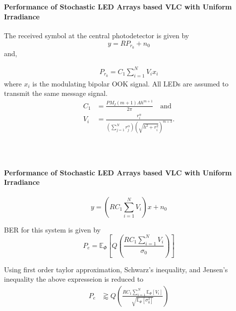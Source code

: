 \documentclass[slidestop,usepdftitle=false]{gvvslides}
\providecommand{\sbrak}[1]{\ensuremath{{}\left[#1\right]}}
\providecommand{\brak}[1]{\ensuremath{\left(#1\right)}}
\begin{document}
\begin{frame}
\frametitle{\,}
\framesubtitle{Performance of Stochastic LED Arrays based VLC with Uniform Irradiance}
\begin{list}{}{}
\vfill
\item<1->The received symbol at the central photodetector is given by 
\begin{equation}
y=RP_{r_0}+n_0 \nonumber
\label{rx_center}
\end{equation}
and,
\item<2>
\vspace{-.4in}
\begin{align}
P_{r_0}
=C_1\sum_{i=1}^NV_i x_i  \nonumber
\label{pr_exact}
\end{align}
where $x_i$ is the modulating bipolar OOK signal. All LEDs are assumed to transmit the same message signal.
\footnotesize{
\begin{equation}
\begin{split}
C_1&=\frac{PM_I\brak{m+1}Ah^{m+1}}{2\pi} \quad \text{and}
\\
V_i &= \frac{r_i^{\alpha}}{ \brak{\sum_{j=1}^Nr_j^{\alpha}}\brak{\sqrt{h^2+r_i^2}}^{m+3}}.
\end{split} \nonumber
\label{variable_Vi}
\end{equation}
}
\vfill
\end{list}
\end{frame}

\begin{frame}
\frametitle{\,}
\framesubtitle{Performance of Stochastic LED Arrays based VLC with Uniform Irradiance}
\begin{list}{}{}
\vfill
\item<1->
\begin{equation}
y =  \brak{RC_1\sum_{i=1}^NV_i}x+n_0 \nonumber
\label{rx_exact}
\end{equation}
\vfill
\item<2->
BER for this system is given by
\begin{equation}
P_e  =\mathbb{E}_{\Phi}\sbrak{\textit{Q}\brak{\frac{RC_1\sum_{i=1}^N V_i}{\sigma_0}}} \nonumber
\end{equation}
\vfill
\item<3>
 Using first order taylor approximation, Schwarz's inequality, and Jensen's inequality the above expresseion is reduced to
\begin{equation}
\begin{split}
P_e  &\gtrapprox  \textit{Q}\brak{\frac{RC_1\sum_{i=1}^N \mathbb{E}_{\Phi}\sbrak {V_i}}{ \sqrt{\mathbb{E}_{\Phi}\sbrak{\sigma_0^2}}}}
  \end{split}\nonumber
\label{BER_final}
\end{equation}
\vfill
\end{list}
\end{frame}
\end{document}
